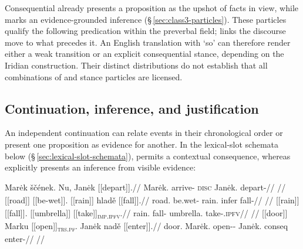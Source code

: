 Consequential  already presents a proposition as the upshot of facts
in view, while  marks an evidence-grounded inference
(§\,\ref{sec:class3-particles}). These particles qualify the following
predication within the preverbal field;  links the discourse move to
what precedes it. An English translation with `so' can therefore render either
a weak transition or an explicit consequential stance, depending on the
Iridian construction. Their distinct distributions do not establish that
all combinations of  and stance particles are licensed.

\subsection{Continuation, inference, and justification}
\label{sec:spoken-justification-examples}

An independent continuation can relate events in their chronological order
or present one proposition as evidence for another. In the lexical-slot
schemata below (§\,\ref{sec:lexical-slot-schemata}),  permits a
contextual consequence, whereas  explicitly presents an inference
from visible evidence:

\pex\label{ex:slot-discourse-relations}
\a
\begingl
\gla Marėk ščének. Nu, Janėk \textnormal{[[depart]]}\textsubscript{\Pf{}}.//
\glb Marėk.\Dir{} arrive-\Pf{} \textsc{disc} Janėk.\Dir{} depart-\Pf{}//
\glft {}
//
\endgl
\a
\begingl
\gla \textnormal{[[road]]}\textsubscript{\Dir{}} \textnormal{[[be-wet]]}\textsubscript{\Cont{}}. \textnormal{[[rain]]}\textsubscript{\Dir{}} hladě \textnormal{[[fall]]}\textsubscript{\Pf{}}.//
\glb road.\Dir{} be.wet-\Cont{} rain.\Dir{} infer fall-\Pf{}//
\glft {}
//
\endgl
\a
\begingl
\gla \textnormal{[[rain]]}\textsubscript{\Dir{}} \textnormal{[[fall]]}\textsubscript{\Prog{}}. \textnormal{[[umbrella]]}\textsubscript{\Dir{}} \textnormal{[[take]]}\textsubscript{\textsc{imp.ipfv}}.//
\glb rain.\Dir{} fall-\Prog{} umbrella.\Dir{} take-\Imp{}.\textsc{ipfv}//
\glft {}
//
\endgl
\a
\begingl
\gla \textnormal{[[door]]}\textsubscript{\Dir{}} Marku \textnormal{[[open]]}\textsubscript{\textsc{trs.pf}}. Janėk nadě \textnormal{[[enter]]}\textsubscript{\Ctpl{}}.//
\glb door.\Dir{} Marėk.\Trs{} open-\Trs{}-\Pf{} Janėk.\Dir{} conseq enter-\Ctpl{}//
\glft {}
//
\endgl
\xe

